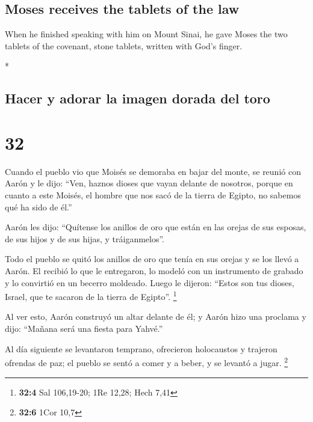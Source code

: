 \begin{paracol}{2}
\begin{otherlanguage}{english}
\hypertarget{moses-receives-the-tablets-of-the-law}{%
\subsection{Moses receives the tablets of the
law}\label{moses-receives-the-tablets-of-the-law}}

 When he finished speaking with him on Mount Sinai, he
gave Moses the two tablets of the covenant, stone tablets, written with
God's finger.

\end{otherlanguage}

\switchcolumn[0]*

\hypertarget{hacer-y-adorar-la-imagen-dorada-del-toro}{%
\subsection{Hacer y adorar la imagen dorada del
toro}\label{hacer-y-adorar-la-imagen-dorada-del-toro}}

\hypertarget{section-62}{%
\section{32}\label{section-62}}

 Cuando el pueblo vio que Moisés se demoraba en bajar del
monte, se reunió con Aarón y le dijo: ``Ven, haznos dioses que vayan
delante de nosotros, porque en cuanto a este Moisés, el hombre que nos
sacó de la tierra de Egipto, no sabemos qué ha sido de él.''

 Aarón les dijo: ``Quítense los anillos de oro que están
en las orejas de sus esposas, de sus hijos y de sus hijas, y
tráiganmelos''.

 Todo el pueblo se quitó los anillos de oro que tenía en
sus orejas y se los llevó a Aarón.  El recibió lo que le
entregaron, lo modeló con un instrumento de grabado y lo convirtió en un
becerro moldeado. Luego le dijeron: ``Estos son tus dioses, Israel, que
te sacaron de la tierra de Egipto''. \footnote{\textbf{32:4} Sal
  106,19-20; 1Re 12,28; Hech 7,41}

 Al ver esto, Aarón construyó un altar delante de él; y
Aarón hizo una proclama y dijo: ``Mañana será una fiesta para Yahvé.''

 Al día siguiente se levantaron temprano, ofrecieron
holocaustos y trajeron ofrendas de paz; el pueblo se sentó a comer y a
beber, y se levantó a jugar. \footnote{\textbf{32:6} 1Cor 10,7}


\end{paracol}
